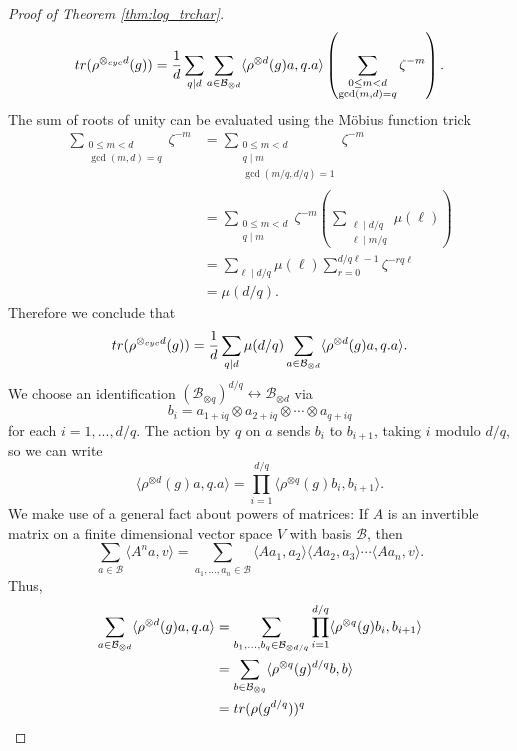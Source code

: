 \documentclass[10pt,a4paper]{amsart}
\begin{document}
\begin{proof}[Proof of Theorem \ref{thm:log_trchar}]
\begin{align*}
{\rm tr}(\rho^{\otimes_{\rm cyc} d}(g)) = \frac{1}{d}\sum_{q\mid d}\sum_{a\in\mathcal{B}_{\otimes d}} \langle\rho^{\otimes d}(g)a,q.a\rangle\left(\sum_{\substack{0\le m < d\\\gcd(m,d)=q}}\zeta^{-m} \right).
\end{align*}
The sum of roots of unity can be evaluated using the M\"obius function trick
\begin{align*}
\sum_{\substack{0\le m < d\\\gcd(m,d)=q}}\zeta^{-m} &= \sum_{\substack{0\le m < d\\q\mid m\\\gcd(m/q,d/q)=1}} \zeta^{-m}\\
&=\sum_{\substack{0\le m< d\\ q\mid m}} \zeta^{-m} \left(\sum_{\substack{\ell\mid d/q\\\ell\mid m/q}} \mu(\ell)\right)\\
&= \sum_{\ell\mid d/q} \mu(\ell) \sum_{r=0}^{d/q\ell - 1} \zeta^{-rq\ell}\\
&= \mu(d/q).
\end{align*}
Therefore we conclude that
\[
{\rm tr}(\rho^{\otimes_{\rm cyc} d}(g)) = \frac{1}{d}\sum_{q\mid d}\mu(d/q)\sum_{a\in\mathcal{B}_{\otimes d}} \langle\rho^{\otimes d}(g)a,q.a\rangle.
\]
We choose an identification $(\mathcal{B}_{\otimes q})^{d/q} \leftrightarrow \mathcal{B}_{\otimes d}$ via
\[
b_i = a_{1+iq} \otimes a_{2+iq} \otimes \cdots \otimes a_{q+iq}
\]
for each $i=1,...,d/q$. The action by $q$ on $a$ sends $b_i$ to $b_{i+1}$, taking $i$ modulo $d/q$, so we can write
\[
\langle\rho^{\otimes d}(g)a,q.a\rangle = \prod_{i=1}^{d/q} \langle \rho^{\otimes q}(g) b_i, b_{i+1}\rangle.
\]
We make use of a general fact about powers of matrices: If $A$ is an invertible matrix on a finite dimensional vector space $V$ with basis $\mathcal{B}$, then
\[
\sum_{a\in \mathcal{B}}\langle A^n a, v\rangle = \sum_{a_1,...,a_n\in \mathcal{B}} \langle A a_1,a_2\rangle\langle A a_2,a_3\rangle\cdots \langle A a_n,v\rangle.
\]
Thus,
\begin{align*}
\sum_{a\in\mathcal{B}_{\otimes d}} \langle\rho^{\otimes d}(g)a,q.a\rangle &= \sum_{b_1,...,b_{q}\in\mathcal{B}_{\otimes d/q}} \prod_{i=1}^{d/q}\langle \rho^{\otimes q}(g)b_i,b_{i+1}\rangle\\
&= \sum_{b\in\mathcal{B}_{\otimes q}}\langle \rho^{\otimes q}(g)^{d/q} b,b\rangle\\
&= {\rm tr}(\rho(g^{d/q}))^{q}
\end{align*}

\end{proof}
\end{document}
